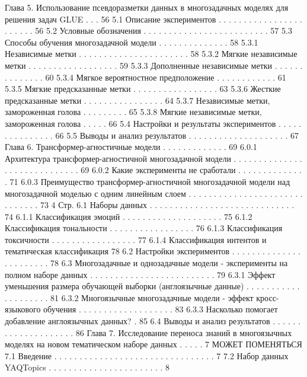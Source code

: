 Глава 5. Использование псевдоразметки данных в
многозадачных моделях для решения задач GLUE . . . 56
5.1 Описание экспериментов . . . . . . . . . . . . . . . . . . . . . . . 56
5.2 Условные обозначения . . . . . . . . . . . . . . . . . . . . . . . . . 57
5.3 Способы обучения многозадачной модели . . . . . . . . . . . . . . 58
5.3.1 Независимые метки . . . . . . . . . . . . . . . . . . . . . . 58
5.3.2 Мягкие независимые метки . . . . . . . . . . . . . . . . . . 59
5.3.3 Дополненные независимые метки . . . . . . . . . . . . . . 60
5.3.4 Мягкое вероятностное предположение . . . . . . . . . . . . 61
5.3.5 Мягкие предсказанные метки . . . . . . . . . . . . . . . . . 63
5.3.6 Жесткие предсказанные метки . . . . . . . . . . . . . . . . 64
5.3.7 Независимые метки, замороженная голова . . . . . . . . . 65
5.3.8 Мягкие независимые метки, замороженная голова . . . . . 66
5.4 Настройки и результаты экспериментов . . . . . . . . . . . . . . . 66
5.5 Выводы и анализ результатов . . . . . . . . . . . . . . . . . . . . 67
Глава 6. Трансформер-агностичные модели . . . . . . . . . . . . . 69
6.0.1 Архитектура трансформер-агностичной многозадачной
модели . . . . . . . . . . . . . . . . . . . . . . . . . . . . . 69
6.0.2 Какие эксперименты не сработали . . . . . . . . . . . . . . 71
6.0.3 Преимущество трансформер-агностичной многозадачной
модели над многозадачной моделью с одним линейным
слоем . . . . . . . . . . . . . . . . . . . . . . . . . . . . . . 73
4
Стр.
6.1 Наборы данных . . . . . . . . . . . . . . . . . . . . . . . . . . . . . 74
6.1.1 Классификация эмоций . . . . . . . . . . . . . . . . . . . . 75
6.1.2 Классификация тональности . . . . . . . . . . . . . . . . . 76
6.1.3 Классификация токсичности . . . . . . . . . . . . . . . . . 77
6.1.4 Классификация интентов и тематическая классификация 78
6.2 Настройки экспериментов . . . . . . . . . . . . . . . . . . . . . . . 78
6.3 Многозадачные и однозадачные модели - эксперименты на
полном наборе данных . . . . . . . . . . . . . . . . . . . . . . . . . 79
6.3.1 Эффект уменьшения размера обучающей выборки
(англоязычные данные) . . . . . . . . . . . . . . . . . . . . 81
6.3.2 Многоязычные многозадачные модели - эффект
кросс-языкового обучения . . . . . . . . . . . . . . . . . . . 83
6.3.3 Насколько помогает добавление англоязычных данных? . 85
6.4 Выводы и анализ результатов . . . . . . . . . . . . . . . . . . . . 86
Глава 7. Исследование переноса знаний в многоязычных
моделях на новом тематическом наборе данных . . . . . 7 МОЖЕТ ПОМЕНЯТЬСЯ
7.1 Введение . . . . . . . . . . . . . . . . . . . . . . . . . . . . . . . . 7
7.2 Набор данных YAQTopics . . . . . . . . . . . . . . . . . . . . . . . 8

